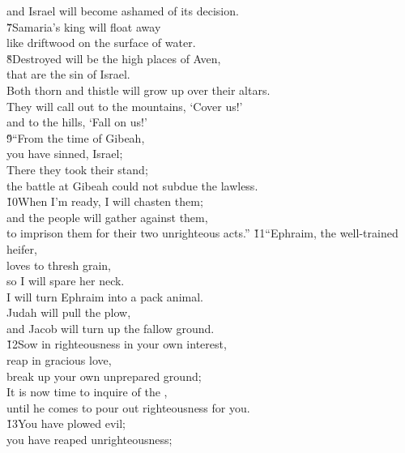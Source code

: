 \begin{poetry}
\poemll    and Israel will become ashamed of its decision. \\
\poeml \v{7}Samaria's king will float away \\
\poemll    like driftwood on the surface of water. \\
\poeml \v{8}Destroyed will be the high places of Aven, \\
\poemll    that are the sin of Israel. \\
\poemlll       Both thorn and thistle will grow up over their altars. \\
\poeml They will call out to the mountains, `Cover us!' \\
\poemll    and to the hills, `Fall on us!' \\
\poeml \v{9}``From the time of Gibeah, \\
\poemll    you have sinned, Israel; \\
\poeml There they took their stand; \\
\poemll    the battle at Gibeah could not subdue the lawless. \\
\poeml \v{10}When I'm ready, I will chasten them; \\
\poemll    and the people will gather against them, \\
\poemlll       to imprison them for their two unrighteous acts.''
\poeml \v{11}``Ephraim, the well-trained heifer, \\
\poemll    loves to thresh grain, \\
\poeml so I will spare her neck. \\
\poemll    I will turn Ephraim into a pack animal. \\
\poeml Judah will pull the plow, \\
\poemll    and Jacob will turn up the fallow ground. \\
\poeml \v{12}Sow in righteousness in your own interest, \\
\poemll    reap in gracious love, \\
\poemlll       break up your own unprepared ground; \\
\poeml It is now time to inquire of the , \\
\poemll    until he comes to pour out righteousness for you. \\
\poeml \v{13}You have plowed evil; \\
\poemll    you have reaped unrighteousness; \\

\end{poetry}
